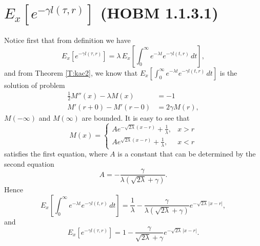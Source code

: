 \section{ $E_x[ e^{-\gamma l(\tau,r)} ]$ (HOBM 1.1.3.1)}
Notice first that from definition we have
\[
  E_x \left[ e^{-\gamma l(\tau,r)} \right] 
    = \lambda \, E_x 
        \left[ 
          \int_0^{\infty} e^{-\lambda t} e^{-\gamma l(t,r)} \, dt 
        \right],
\]
and from Theorem \ref{T:kac2}, we know that 
$E_x[ \int_0^{\infty} e^{-\lambda t} e^{-\gamma l(t,r)} \, dt ]$
is the solution of problem
\begin{align*}
  \frac{1}{2} M''(x) - \lambda M(x) &= -1  \\
  M'(r+0) - M'(r-0) &= 2\gamma M(r),
\end{align*}
$M(-\infty)$ and $M(\infty)$ are bounded.
It is easy to see that
\[
  M(x)= 
    \begin{cases}
      A e^{-\sqrt{2\lambda} (x-r)} + \frac{1}{\lambda}, & x>r \\
      A e^{\sqrt{2\lambda} (x-r)} + \frac{1}{\lambda},  & x<r
    \end{cases}
\]
satisfies the first equation, where $A$ is a constant that can be determined by
the second equation
\[
  A = - \frac{\gamma}{\lambda (\sqrt{2\lambda}+\gamma) }.
\]
Hence
\begin{equation}
  E_x \left[ \int_0^{\infty} e^{-\lambda t} e^{-\gamma l(t,r)} \, dt \right]
    = \frac{1}{\lambda} - \frac{\gamma}{\lambda (\sqrt{2\lambda}+\gamma)} 
                          e^{-\sqrt{2\lambda}\,|x-r|},
\end{equation}
and
\begin{equation}
  E_x \left[ e^{-\gamma l(\tau,r)} \right] 
    = 1 - \frac{\gamma}{\sqrt{2\lambda}+\gamma} e^{-\sqrt{2\lambda}\,|x-r|}.
\end{equation}


